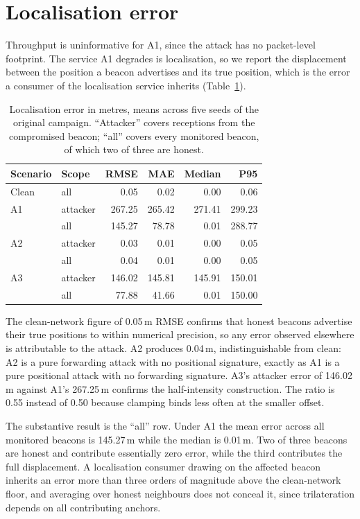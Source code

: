 \documentclass[pdflatex,sn-mathphys-num]{sn-jnl}
\begin{document}
\section{Localisation error}
\label{sec:locerr}

Throughput is uninformative for A1, since the attack has no packet-level
footprint. The service A1 degrades is localisation, so we report the
displacement between the position a beacon advertises and its true position,
which is the error a consumer of the localisation service inherits
(Table~\ref{tab:locerr}).

\begin{table}[!t]
\caption{Localisation error in metres, means across five seeds of the original
campaign. ``Attacker'' covers receptions from the compromised beacon; ``all''
covers every monitored beacon, of which two of three are honest.}
\label{tab:locerr}
\centering
\footnotesize
\begin{tabular}{@{}llrrrr@{}}
\toprule
Scenario & Scope & RMSE & MAE & Median & P95 \\
\midrule
Clean & all & 0.05 & 0.02 & 0.00 & 0.06 \\
A1 & attacker & 267.25 & 265.42 & 271.41 & 299.23 \\
   & all & 145.27 & 78.78 & 0.01 & 288.77 \\
A2 & attacker & 0.03 & 0.01 & 0.00 & 0.05 \\
   & all & 0.04 & 0.01 & 0.00 & 0.05 \\
A3 & attacker & 146.02 & 145.81 & 145.91 & 150.01 \\
   & all & 77.88 & 41.66 & 0.01 & 150.00 \\
\bottomrule
\end{tabular}
\end{table}

The clean-network figure of 0.05\,m RMSE confirms that honest beacons advertise
their true positions to within numerical precision, so any error observed
elsewhere is attributable to the attack. A2 produces 0.04\,m, indistinguishable
from clean: A2 is a pure forwarding attack with no positional signature, exactly
as A1 is a pure positional attack with no forwarding signature. A3's attacker
error of 146.02\,m against A1's 267.25\,m confirms the half-intensity
construction. The ratio is 0.55 instead of 0.50 because clamping binds less
often at the smaller offset.

The substantive result is the ``all'' row. Under A1 the mean error across all
monitored beacons is 145.27\,m while the median is 0.01\,m. Two of three beacons
are honest and contribute essentially zero error, while the third contributes
the full displacement. A localisation consumer drawing on the affected beacon
inherits an error more than three orders of magnitude above the clean-network floor, and
averaging over honest neighbours does not conceal it, since trilateration
depends on all contributing anchors.
\end{document}
